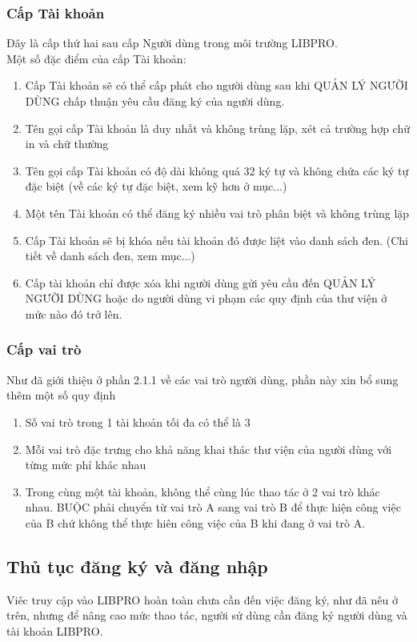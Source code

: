 \documentclass[12pt,a4paper]{report}
\begin{document}
            \subsubsection{Cấp Tài khoản}
            Đây là cấp thứ hai sau cấp Người dùng trong môi trường LIBPRO.\\
            Một số đặc điểm của cấp Tài khoản:
            \begin{enumerate}
                \item Cấp Tài khoản sẽ có thể cấp phát cho người dùng sau khi QUẢN LÝ NGƯỜI DÙNG chấp thuận yêu cầu đăng ký của người dùng.
                \item Tên gọi cấp Tài khoản là duy nhất và không trùng lặp, xét cả trường hợp chữ in và chữ thường
                \item Tên gọi cấp Tài khoản có độ dài không quá 32 ký tự và không chứa các ký tự đặc biệt (về các ký tự đặc biệt, xem kỹ hơn ở mục...)
                \item Một tên Tài khoản có thể đăng ký nhiều vai trò phân biệt và không trùng lặp
                \item Cấp Tài khoản sẽ bị khóa nếu tài khoản đó được liệt vào danh sách đen. (Chi tiết về danh sách đen, xem mục...)
                \item Cấp tài khoản chỉ được xóa khi người dùng gửi yêu cầu đến QUẢN LÝ NGƯỜI DÙNG hoặc do người dùng vi phạm các quy định của thư viện ở mức nào đó trở lên.
            \end{enumerate}
            \subsubsection{Cấp vai trò}
            Như đã giới thiệu ở phần 2.1.1 về các vai trò người dùng, phần này xin bổ sung thêm một số quy định
            \begin{enumerate}
                \item Số vai trò trong 1 tài khoản tối đa có thể là 3
                \item Mỗi vai trò đặc trưng cho khả năng khai thác thư viện của người dùng với từng mức phí khác nhau
                \item Trong cùng một tài khoản, không thể cùng lúc thao tác ở 2 vai trò khác nhau. BUỘC phải chuyển từ vai trò A sang vai trò B để thực hiện công việc của B chứ không thể thực hiên công việc của B khi đang ở vai trò A.
            \end{enumerate}
        \subsection{Thủ tục đăng ký và đăng nhập}
        Viêc truy cập vào LIBPRO hoàn toàn chưa cần đến việc đăng ký, như đã nêu ở trên, nhưng để nâng cao mức thao tác, người sử dùng cần đăng ký người dùng và tài khoản LIBPRO.\\
\end{document}
